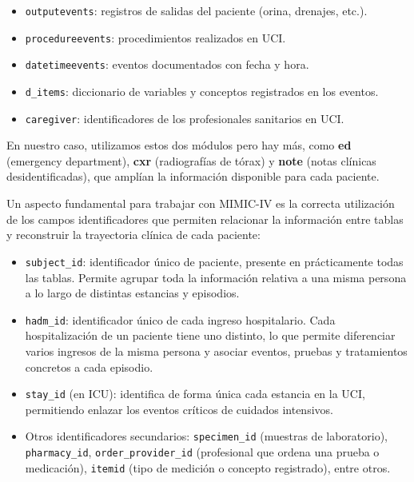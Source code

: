 \begin{itemize}
\begin{itemize}
        \item \texttt{outputevents}: registros de salidas del paciente (orina, drenajes, etc.).
        \item \texttt{procedureevents}: procedimientos realizados en UCI.
        \item \texttt{datetimeevents}: eventos documentados con fecha y hora.
        \item \texttt{d\_items}: diccionario de variables y conceptos registrados en los eventos.
        \item \texttt{caregiver}: identificadores de los profesionales sanitarios en UCI.
    \end{itemize}
\end{itemize}



En nuestro caso, utilizamos estos dos módulos pero hay más, como \textbf{ed} (emergency department), \textbf{cxr} (radiografías de tórax) y \textbf{note} (notas clínicas desidentificadas), que amplían la información disponible para cada paciente.

Un aspecto fundamental para trabajar con MIMIC-IV es la correcta utilización de los campos identificadores que permiten relacionar la información entre tablas y reconstruir la trayectoria clínica de cada paciente:

\begin{itemize}
    \item \texttt{subject\_id}: identificador único de paciente, presente en prácticamente todas las tablas. Permite agrupar toda la información relativa a una misma persona a lo largo de distintas estancias y episodios.
    \item \texttt{hadm\_id}: identificador único de cada ingreso hospitalario. Cada hospitalización de un paciente tiene uno distinto, lo que permite diferenciar varios ingresos de la misma persona y asociar eventos, pruebas y tratamientos concretos a cada episodio.
    \item \texttt{stay\_id} (en ICU): identifica de forma única cada estancia en la UCI, permitiendo enlazar los eventos críticos de cuidados intensivos.
    \item Otros identificadores secundarios: \texttt{specimen\_id} (muestras de laboratorio), \texttt{pharmacy\_id}, \texttt{order\_provider\_id} (profesional que ordena una prueba o medicación), \texttt{itemid} (tipo de medición o concepto registrado), entre otros.
\end{itemize}

